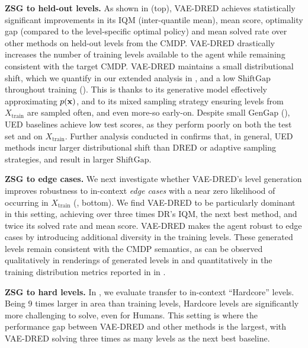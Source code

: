 \textbf{ZSG to held-out levels.} As shown in  (top), VAE-DRED achieves statistically significant improvements in its IQM (inter-quantile mean), mean score, optimality gap (compared to the level-specific optimal policy) and mean solved rate over other methods on held-out levels from the CMDP. VAE-DRED drastically increases the number of training levels available to the agent while remaining consistent with the target CMDP. VAE-DRED maintains a small distributional shift, which we quantify in our extended analysis in , and a low $\text{ShiftGap}$ throughout training (). This is thanks to its generative model effectively approximating $p({\mathbf{x}})$, and to its mixed sampling strategy ensuring levels from $X_\text{train}$ are sampled often, and even more-so early-on. Despite small $\text{GenGap}$ (), UED baselines achieve low test scores, as they perform poorly on both the test set and on $X_\text{train}$.  Further analysis conducted in  confirms that, in general, UED methods incur larger distributional shift than DRED or adaptive sampling strategies, and result in larger $\text{ShiftGap}$.

\textbf{ZSG to edge cases.} We next investigate whether VAE-DRED's level generation improves robustness to in-context \textit{edge cases} with a near zero likelihood of occurring in $X_\text{train}$ (, bottom). We find VAE-DRED to be particularly dominant in this setting, achieving over three times DR's IQM, the next best method, and twice its solved rate and mean score. VAE-DRED makes the agent robust to edge cases by introducing additional diversity in the training levels. These generated levels remain consistent with the CMDP semantics, as can be observed qualitatively in renderings of generated levels in  and quantitatively in the training distribution metrics reported in in .

\textbf{ZSG to hard levels.} In , we evaluate transfer to in-context ``Hardcore'' levels. Being 9 times larger in area than training levels, Hardcore levels are significantly more
challenging to solve, even for Humans. This setting is where the performance gap between VAE-DRED and other methods is the largest, with VAE-DRED solving three times as many levels as the next best baseline.

